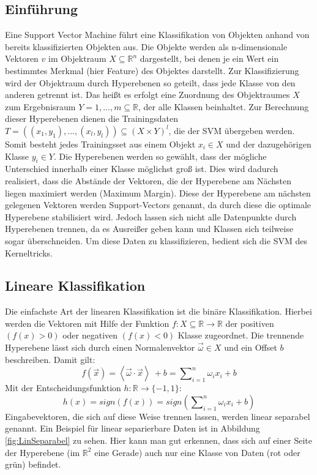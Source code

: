 \subsection{Einführung}
\label{subsec:einfuehrung}
Eine Support Vector Machine führt eine Klassifikation von Objekten anhand von bereits klassifizierten Objekten aus. Die Objekte werden als n-dimensionale Vektoren $v$ im Objektraum $X \subseteq \mathbb{R}^{n} $ dargestellt, bei denen je ein Wert ein bestimmtes Merkmal (hier Feature) des Objektes darstellt. Zur Klassifizierung wird der Objektraum durch Hyperebenen so geteilt, dass jede Klasse von den anderen getrennt ist. Das heißt es erfolgt eine Zuordnung des Objektraumes $X$ zum Ergebnisraum $Y = {1,...,m} \subseteq \mathbb{R}$, der alle Klassen beinhaltet. Zur Berechnung dieser Hyperebenen dienen die Trainingsdaten $T =((x_{1},y_{1}),...,(x_{l},y_{l})) \subseteq (X \times Y)^{l}$, die der SVM übergeben werden. Somit besteht jedes Trainingsset aus einem Objekt $x_{i} \in X$ und der dazugehörigen Klasse $y_{i} \in Y$. Die Hyperebenen werden so gewählt, dass der mögliche Unterschied innerhalb einer Klasse möglichst groß ist. Dies wird dadurch realisiert, dass die Abstände der Vektoren, die der Hyperebene am Nächsten liegen maximiert werden (Maximum Margin). Diese der Hyperebene am nächsten gelegenen Vektoren werden \glqq{}Support-Vectors\grqq{} genannt, da durch diese die optimale Hyperebene \glqq{}stabilisiert\grqq{} wird. Jedoch lassen sich nicht alle Datenpunkte durch Hyperebenen trennen, da es Ausreißer geben kann und Klassen sich teilweise sogar überschneiden. Um diese Daten zu klassifizieren, bedient sich die SVM des Kerneltricks. \cite{laechele-svm}

\subsection{Lineare Klassifikation}
\label{subsec:lineare-klassifikation}
Die einfachste Art der linearen Klassifikation ist die binäre Klassifikation. Hierbei werden die Vektoren mit Hilfe der Funktion $ f: X \subseteq \mathbb{R} \rightarrow \mathbb{R} $ der positiven $ (f(x)>0) $ oder negativen $ (f(x)<0) $ Klasse zugeordnet. Die trennende Hyperebene lässt sich durch einen Normalenvektor $\vec{\omega} \in X$ und ein Offset $b$ beschreiben.
Damit gilt:\[ f(\vec{x})=\left\langle \vec{\omega} \cdot \vec{x} \right\rangle\ + b = \sum\nolimits_{i=1}^n \omega_{i} x_{i} + b \]
Mit der Entscheidungsfunktion $h : \mathbb{R} \rightarrow \{-1,1\}$:
\[ h(x) = sign(f(x)) = sign (\sum\nolimits_{i=1}^n \omega_{i} x_{i} + b)\]
Eingabevektoren, die sich auf diese Weise trennen lassen, werden linear separabel genannt. Ein Beispiel für linear separierbare Daten ist in Abbildung \ref{fig:LinSeparabel} zu sehen. Hier kann man gut erkennen, dass sich auf einer Seite der Hyperebene (im $\mathbb{R}^2$ eine Gerade) auch nur eine Klasse von Daten (rot oder grün) befindet.

